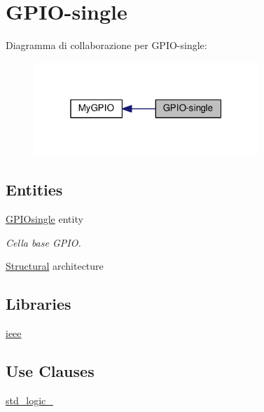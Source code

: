 \hypertarget{group___g_p_i_o-single}{\section{G\+P\+I\+O-\/single}
\label{group___g_p_i_o-single}
}
Diagramma di collaborazione per G\+P\+I\+O-\/single\+:\nopagebreak
\begin{figure}[H]
\begin{center}
\leavevmode
\includegraphics[width=241pt]{group___g_p_i_o-single}
\end{center}
\end{figure}
\subsection*{Entities}
\begin{DoxyCompactItemize}
\item 
\hyperlink{class_g_p_i_osingle}{G\+P\+I\+Osingle} entity
\begin{DoxyCompactList}\small\item\em Cella base G\+P\+I\+O. \end{DoxyCompactList}\item 
\hyperlink{class_g_p_i_osingle_1_1_structural}{Structural} architecture
\end{DoxyCompactItemize}
\subsection*{Libraries}
 \begin{DoxyCompactItemize}
\item 
\hypertarget{group___g_p_i_o-single_ga0a6af6eef40212dbaf130d57ce711256}{\hyperlink{group___g_p_i_o-single_ga0a6af6eef40212dbaf130d57ce711256}{ieee} }\label{group___g_p_i_o-single_ga0a6af6eef40212dbaf130d57ce711256}

\end{DoxyCompactItemize}
\subsection*{Use Clauses}
 \begin{DoxyCompactItemize}
\item 
\hypertarget{group___g_p_i_o-single_gacd03516902501cd1c7296a98e22c6fcb}{\hyperlink{group___g_p_i_o-single_gacd03516902501cd1c7296a98e22c6fcb}{std\+\_\+logic\+\_}   }\label{group___g_p_i_o-single_gacd03516902501cd1c7296a98e22c6fcb}

\end{DoxyCompactItemize}
